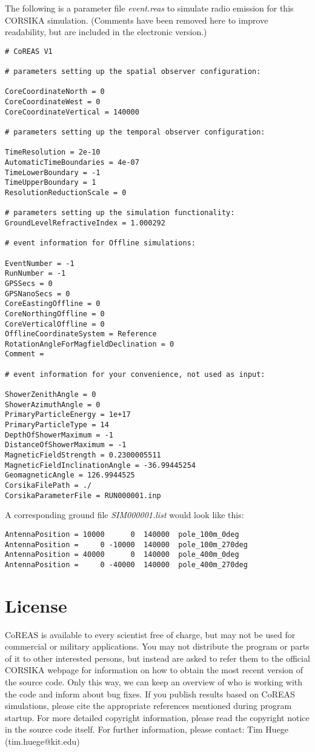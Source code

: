 \documentclass[a4paper,10pt]{article}
\begin{document}
The following is a parameter file {\it event.reas} to simulate radio emission for this CORSIKA simulation. (Comments have been removed here to improve readability, but are included in the electronic version.)
%
\begin{verbatim}
# CoREAS V1

# parameters setting up the spatial observer configuration:

CoreCoordinateNorth = 0
CoreCoordinateWest = 0
CoreCoordinateVertical = 140000

# parameters setting up the temporal observer configuration:

TimeResolution = 2e-10
AutomaticTimeBoundaries = 4e-07
TimeLowerBoundary = -1
TimeUpperBoundary = 1
ResolutionReductionScale = 0

# parameters setting up the simulation functionality:
GroundLevelRefractiveIndex = 1.000292

# event information for Offline simulations:

EventNumber = -1
RunNumber = -1
GPSSecs = 0
GPSNanoSecs = 0
CoreEastingOffline = 0
CoreNorthingOffline = 0
CoreVerticalOffline = 0
OfflineCoordinateSystem = Reference
RotationAngleForMagfieldDeclination = 0
Comment =

# event information for your convenience, not used as input:

ShowerZenithAngle = 0
ShowerAzimuthAngle = 0
PrimaryParticleEnergy = 1e+17
PrimaryParticleType = 14
DepthOfShowerMaximum = -1
DistanceOfShowerMaximum = -1
MagneticFieldStrength = 0.2300005511
MagneticFieldInclinationAngle = -36.99445254
GeomagneticAngle = 126.9944525
CorsikaFilePath = ./
CorsikaParameterFile = RUN000001.inp
\end{verbatim}
%
A corresponding ground file {\it SIM000001.list} would look like this:
%
\begin{verbatim}
AntennaPosition = 10000      0  140000  pole_100m_0deg
AntennaPosition =     0 -10000  140000  pole_100m_270deg
AntennaPosition = 40000      0  140000  pole_400m_0deg
AntennaPosition =     0 -40000  140000  pole_400m_270deg
\end{verbatim}

\section{License} \label{sec:license}

CoREAS is available to every scientist free of charge, but may not be used for commercial or military applications. You may not distribute the program or parts of it to other interested persons, but instead are asked to refer them to the official CORSIKA webpage for information on how to obtain the most recent version of the source code. Only this way, we can keep an overview of who is working with the code and inform about bug fixes. If you publish results based on CoREAS simulations, please cite the appropriate references mentioned during program startup. For more detailed copyright information, please read the copyright notice in the source code itself. For further information, please contact: Tim Huege (tim.huege@kit.edu)
\end{document}
